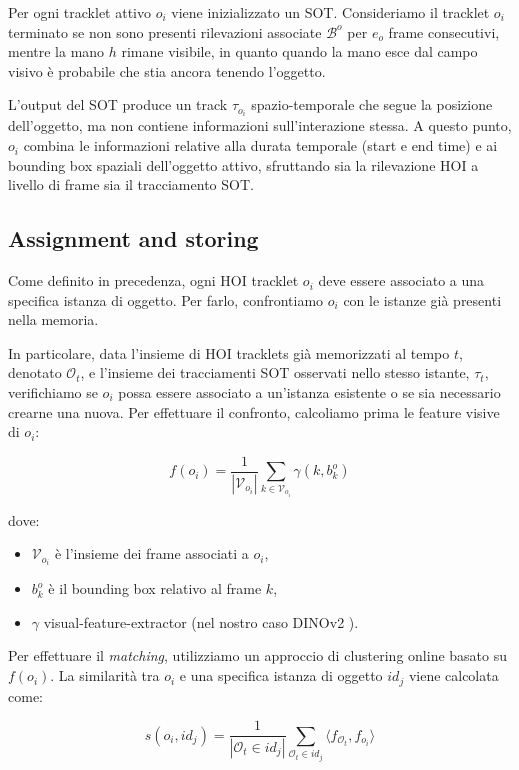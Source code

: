 Per ogni tracklet attivo $o_i$ viene inizializzato un SOT. Consideriamo il tracklet $o_i$ terminato se non sono presenti rilevazioni associate $\mathcal{B}^o$ per $e_o$ frame consecutivi, mentre la mano $h$ rimane visibile, in quanto quando la mano esce dal campo visivo è probabile che stia ancora tenendo l’oggetto.

L’output del SOT produce un track $\tau_{o_i}$ spazio-temporale che segue la posizione dell’oggetto, ma non contiene informazioni sull’interazione stessa. A questo punto, $o_i$ combina le informazioni relative alla durata temporale (start e end time) e ai bounding box spaziali dell’oggetto attivo, sfruttando sia la rilevazione HOI a livello di frame sia il tracciamento SOT.

\subsection*{Assignment and storing}

Come definito in precedenza, ogni HOI tracklet $o_i$ deve essere associato a una specifica istanza di oggetto. Per farlo, confrontiamo $o_i$ con le istanze già presenti nella memoria.  

In particolare, data l'insieme di HOI tracklets già memorizzati al tempo $t$, denotato $\mathcal{O}_t$, e l'insieme dei tracciamenti SOT osservati nello stesso istante, $\tau_t$, verifichiamo se $o_i$ possa essere associato a un'istanza esistente o se sia necessario crearne una nuova. Per effettuare il confronto, calcoliamo prima le feature visive di $o_i$:

\[
f(o_i) = \frac{1}{|\mathcal{V}_{o_i}|} \sum_{k \in \mathcal{V}_{o_i}} \gamma(k, b_k^o)
\]

dove:
\begin{itemize}
    \item $\mathcal{V}_{o_i}$ è l'insieme dei frame associati a $o_i$,
    \item $b_k^o$ è il bounding box relativo al frame $k$,
    \item $\gamma$ visual-feature-extractor (nel nostro caso DINOv2 \cite{oquab2024dinov2learningrobustvisual}).
\end{itemize}

Per effettuare il \emph{matching}, utilizziamo un approccio di clustering online basato su $f(o_i)$. La similarità tra $o_i$ e una specifica istanza di oggetto $id_j$ viene calcolata come:

\[
s(o_i, id_j) = \frac{1}{|\mathcal{O}_t \in id_j|} \sum_{\mathcal{O}_t \in id_j} \langle f_{\mathcal{O}_t}, f_{o_i} \rangle
\]

